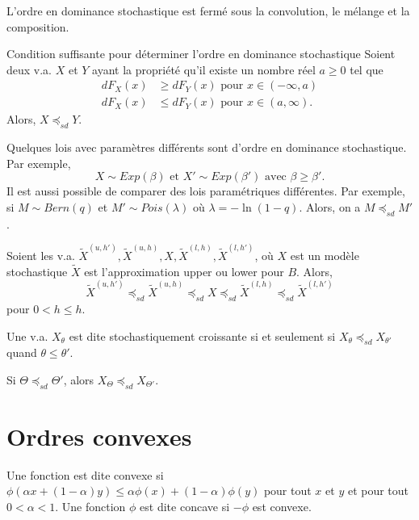 L'ordre en dominance stochastique est fermé sous la convolution, le mélange et la composition.

\begin{proposition}{Condition suffisante pour déterminer l'ordre en dominance stochastique}{}
	Soient deux v.a. $X$ et $Y$ ayant la propriété qu'il existe un nombre réel $a\geq 0$ tel que 
	\begin{align*}
	dF_X(x) &\geq dF_Y(x) \text{ pour } x\in(-\infty, a)\\
	dF_X(x) &\leq dF_Y(x) \text{ pour } x\in(a, \infty).
	\end{align*}
	Alors, $X\preceq_{sd} Y$. 
\end{proposition}

Quelques lois avec paramètres différents sont d'ordre en dominance stochastique. Par exemple, 
$$X \sim Exp(\beta) \text{ et } X' \sim Exp(\beta') \text{ avec } \beta \geq \beta'.$$
Il est aussi possible de comparer des lois paramétriques différentes. Par exemple, si $M \sim Bern(q)$ et $M' \sim Pois(\lambda)$ où $\lambda = -\ln (1 - q)$. Alors, on a $M \preceq_{sd} M'$.

\begin{proposition}{}{}
	Soient les v.a. $\widetilde{X}^{(u, h')}, \widetilde{X}^{(u, h)}, X, \widetilde{X}^{(l, h)}, \widetilde{X}^{(l, h')}$, où $X$ est un modèle stochastique $\widetilde{X}$ est l'approximation upper ou lower pour $B$. Alors, 
	$$\widetilde{X}^{(u, h')} \preceq_{sd}\widetilde{X}^{(u, h)}\preceq_{sd} X\preceq_{sd} \widetilde{X}^{(l, h)}\preceq_{sd} \widetilde{X}^{(l, h')}$$
	pour $0<h\leq h$. 
\end{proposition}

\begin{definition}{}{}
	Une v.a. $X_\theta$ est dite stochastiquement croissante si et seulement si $X_\theta \preceq_{sd} X_{\theta'}$ quand $\theta\leq \theta'$. 
\end{definition}

\begin{proposition}{}{}
	Si $\Theta \preceq_{sd} \Theta'$, alors $X_\Theta \preceq_{sd} X_{\Theta'}$. 
\end{proposition}

\section{Ordres convexes}

\begin{definition}{}{}
	Une fonction est dite convexe si $\phi(\alpha x + (1-\alpha)y) \leq \alpha \phi(x) + (1-\alpha) \phi(y)$ pour tout $x$ et $y$ et pour tout $0<\alpha<1$. 
	\tcblower
	Une fonction $\phi$ est dite concave si $-\phi$ est convexe. 
\end{definition}

